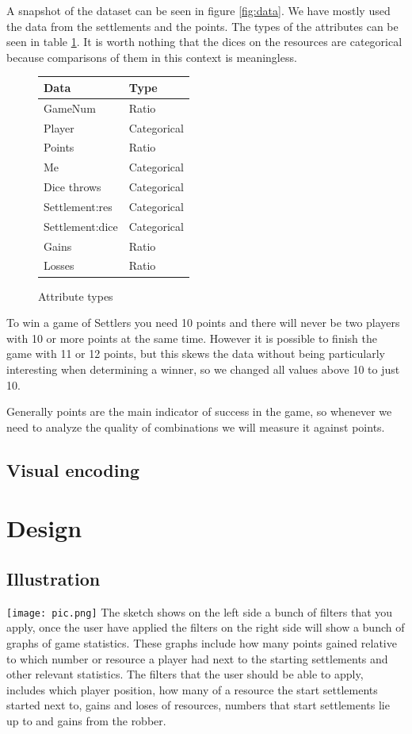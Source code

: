 \documentclass{article}
\begin{document}
A snapshot of the dataset can be seen in figure \ref{fig:data}. We have mostly
used the data from the settlements and the points. The types of the attributes
can be seen in table \ref{tab:types}. It is worth nothing that the dices on
the resources are categorical because comparisons of them in this context is
meaningless. 

\begin{figure}
  \centering
  \begin{tabular}{|l|l|}
    \hline
    Data & Type \\ \hline
    GameNum & Ratio \\ \hline
    Player & Categorical \\ \hline
    Points & Ratio \\ \hline
    Me & Categorical \\ \hline
    Dice throws & Categorical \\ \hline
    Settlement:res & Categorical \\ \hline
    Settlement:dice & Categorical \\ \hline
    Gains & Ratio\\ \hline
    Losses & Ratio \\ \hline
  \end{tabular}
  \caption{Attribute types}
  \label{tab:types}
\end{figure}


To win a game of Settlers you need 10 points and there will never be two
players with 10 or more points at the same time. However it is possible to
finish the game with 11 or 12 points, but this skews the data without being
particularly interesting when determining a winner, so we changed all values
above 10 to just 10.

Generally points are the main indicator of success in the game, so whenever we
need to analyze the quality of combinations we will measure it against points.

\subsection{Visual encoding}

\section{Design}

\subsection{Illustration}
\texttt{[image: pic.png]}
\newpage
\noindent
The sketch shows on the left side a bunch of filters that you apply, once the user
have applied the filters on the right side will show a bunch of graphs of game statistics.
These graphs include how many points gained relative to which number or resource a player
had next to the starting settlements and other relevant statistics.
The filters that the user should be able to apply, includes which player position,
how many of a resource the start settlements started next to, gains and loses of resources,
numbers that start settlements lie up to and gains from the robber.
\end{document}
